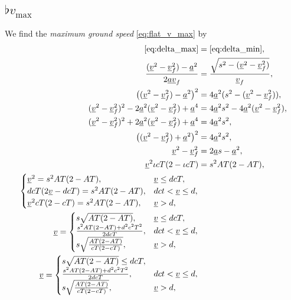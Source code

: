 \subsection{\texorpdfstring{$\flat{v}_{\max}$}{flat v\_max}}
\label{app:derive_flat_v_max}
We find the \emph{maximum ground speed} \eqref{eq:flat_v_max} by
\begin{align}
\nonumber
\eqref{eq:delta_max} &= \eqref{eq:delta_min},\\
\nonumber
\frac{(\flat{v}^2 - \flat{v}_f^2) - \flat{a}^2}{2 \flat{a}\flat{v}_f} &= \frac{\sqrt{s^2 - (\flat{v}^2 - \flat{v}_f^2)}}{\flat{v}_f},\\
\nonumber
\left((\flat{v}^2 - \flat{v}_f^2) - \flat{a}^2\right)^2 &= 4 \flat{a}^2(s^2 - (\flat{v}^2 - \flat{v}_f^2)),\\
\nonumber
(\flat{v}^2 - \flat{v}_f^2)^2 - 2 \flat{a}^2(\flat{v}^2 - \flat{v}_f^2) + \flat{a}^4 &= 4 \flat{a}^2s^2 - 4 \flat{a}^2 (\flat{v}^2 - \flat{v}_f^2),\\
\nonumber
(\flat{v}^2 - \flat{v}_f^2)^2 + 2 \flat{a}^2(\flat{v}^2 - \flat{v}_f^2) + \flat{a}^4 &= 4 \flat{a}^2 s^2,\\
\nonumber
\left((\flat{v}^2 - \flat{v}_f^2) + \flat{a}^2\right)^2 &= 4 \flat{a}^2s^2,\\
\label{eq:maxgs}
\flat{v}^2 - \flat{v}_f^2 &= 2 \flat{a} s - \flat{a}^2,\\
\flat{v}^2 \iota cT (2 - \iota cT) &= s^2 AT(2 - AT),\\
\begin{cases}
\flat{v}^2 = s^2 AT(2 - AT), &\flat{v} \le d cT,\\
d cT (2 \flat{v} - d cT) = s^2 AT(2 - AT), &d ct < \flat{v} \le d,\\
\flat{v}^2 cT (2 - cT) = s^2 AT(2 - AT), &\flat{v} > d,\\
\end{cases}\\
\flat{v} =
\begin{cases}
s \sqrt{AT(2 - AT)}, &\flat{v} \le d cT,\\
\frac{s^2 AT(2 - AT) + d^2 c^2 T^2}{2 d cT}, &d ct < \flat{v} \le d,\\
s \sqrt{\frac{AT(2 - AT)}{cT (2 - cT)}}, &\flat{v} > d,\\
\end{cases}\\
\flat{v} =
\begin{cases}
s \sqrt{AT(2 - AT)} \le d cT,\\
\frac{s^2 AT(2 - AT) + d^2 c^2 T^2}{2 d cT}, &d ct < \flat{v} \le d,\\
s \sqrt{\frac{AT(2 - AT)}{cT (2 - cT)}}, &\flat{v} > d,\\
\end{cases}\\
\end{align}
